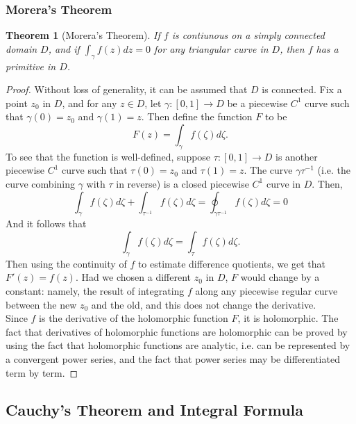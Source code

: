 \documentclass{article}
\newtheorem{theorem}{Theorem}[section]
\begin{document}
\subsubsection{Morera's Theorem}
\begin{theorem}[Morera's Theorem]
If $f$ is contiunous on a simply connected domain $D$, and if $\int_{\gamma}f(z)dz = 0$ for any triangular curve in $D$, then $f$ has a primitive in $D$.
\end{theorem}
\begin{proof}
Without loss of generality, it can be assumed that $D$ is connected. Fix a point $z_0$ in $D$, and for any $z \in D$, let $\gamma : [0, 1] \to D$ be a piecewise $C^1$ curve such that $\gamma(0) = z_0$ and $\gamma(1) = z$. Then define the function $F$ to be 
\begin{equation*}
F(z) = \int_{\gamma} f(\zeta)d\zeta.
\end{equation*}
To see that the function is well-defined, suppose $\tau : [0, 1] \to D$ is another piecewise $C^1$ curve such that $\tau(0) = z_0$ and $\tau(1) = z$. The curve $\gamma \tau^{-1}$ (i.e. the curve combining $\gamma$ with $\tau$ in reverse) is a closed piecewise $C^1$ curve in $D$. Then,
\begin{equation*}
\int_{\gamma} f(\zeta)d\zeta + \int_{\tau^{-1}} f(\zeta)d\zeta = \oint_{\gamma\tau^{-1}}f(\zeta)d\zeta = 0
\end{equation*}
And it follows that 
\begin{equation*}
\int_{\gamma} f(\zeta)d\zeta = \int_{\tau} f(\zeta)d\zeta.
\end{equation*}
Then using the continuity of $f$ to estimate difference quotients, we get that $F'(z) = f(z)$. Had we chosen a different $z_0$ in $D$, $F$ would change by a constant: namely, the result of integrating $f$ along any piecewise regular curve between the new $z_0$ and the old, and this does not change the derivative. \\
Since $f$ is the derivative of the holomorphic function $F$, it is holomorphic. The fact that derivatives of holomorphic functions are holomorphic can be proved by using the fact that holomorphic functions are analytic, i.e. can be represented by a convergent power series, and the fact that power series may be differentiated term by term. 
\end{proof}

\subsection{Cauchy's Theorem and Integral Formula}
\end{document}
